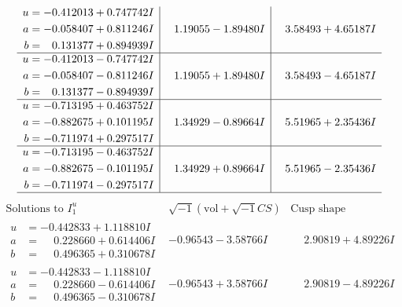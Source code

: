 \documentclass[1p]{elsarticle_modified}
\theoremstyle{definition}
\newcommand{\I}{\sqrt{-1}}
\begin{document}
$$\begin{array}{c|c|c}
\begin{aligned}
u &= -0.412013 + 0.747742 I \\
a &= -0.058407 + 0.811246 I \\
b &= \phantom{-}0.131377 + 0.894939 I\end{aligned}
 & \phantom{-}1.19055 - 1.89480 I & \phantom{-}3.58493 + 4.65187 I \\ \hline\begin{aligned}
u &= -0.412013 - 0.747742 I \\
a &= -0.058407 - 0.811246 I \\
b &= \phantom{-}0.131377 - 0.894939 I\end{aligned}
 & \phantom{-}1.19055 + 1.89480 I & \phantom{-}3.58493 - 4.65187 I \\ \hline\begin{aligned}
u &= -0.713195 + 0.463752 I \\
a &= -0.882675 + 0.101195 I \\
b &= -0.711974 + 0.297517 I\end{aligned}
 & \phantom{-}1.34929 - 0.89664 I & \phantom{-}5.51965 + 2.35436 I \\ \hline\begin{aligned}
u &= -0.713195 - 0.463752 I \\
a &= -0.882675 - 0.101195 I \\
b &= -0.711974 - 0.297517 I\end{aligned}
 & \phantom{-}1.34929 + 0.89664 I & \phantom{-}5.51965 - 2.35436 I\\
 \hline 
 \end{array}$$\newpage$$\begin{array}{c|c|c}  
\text{Solutions to }I^u_{1}& \I (\text{vol} + \sqrt{-1}CS) & \text{Cusp shape}\\
 \hline 
\begin{aligned}
u &= -0.442833 + 1.118810 I \\
a &= \phantom{-}0.228660 + 0.614406 I \\
b &= \phantom{-}0.496365 + 0.310678 I\end{aligned}
 & -0.96543 - 3.58766 I & \phantom{-}2.90819 + 4.89226 I \\ \hline\begin{aligned}
u &= -0.442833 - 1.118810 I \\
a &= \phantom{-}0.228660 - 0.614406 I \\
b &= \phantom{-}0.496365 - 0.310678 I\end{aligned}
 & -0.96543 + 3.58766 I & \phantom{-}2.90819 - 4.89226 I \\ \hline\begin{aligned}

\end{aligned}
\end{array}$$
\end{document}

